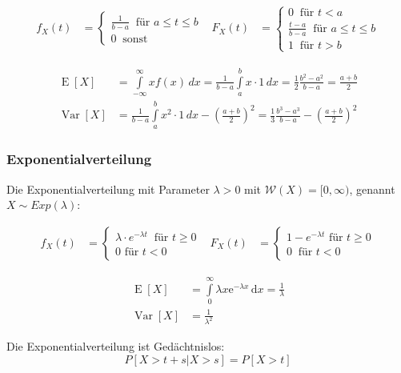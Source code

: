 \documentclass[25pt]{sciposter}
\newcommand{\W}{\mathcal{W}}
\newcommand{\Var}{\operatorname{Var}}
\newcommand{\E}{\operatorname{E}}
\begin{document}
\begin{multicols}{3}
\begin{align*}
	f_X(t) &= \begin{cases}
	\frac{1}{b-a} \ \text{ für } a \leq t \leq b\\
	0 \ \text{ sonst}
	\end{cases}
	& 
	F_X(t) &= \begin{cases}
	0 \ \text{ für } t<a \\
	\frac{t-a}{b-a} \ \text{ für } a \leq t \leq b\\
	1 \ \text{ für } t > b
	\end{cases}
\end{align*}


\begin{align*}
\E[X] &= {\displaystyle\int \limits _{-\infty }^{\infty }xf(x)\,dx={\frac {1}{b-a}}\int \limits _{a}^{b}x\cdot 1\,dx={\frac {1}{2}}{\frac {b^{2}-a^{2}}{b-a}}={\frac {a+b}{2}}} \\ \Var[X] &={\frac {1}{b-a}}\int \limits _{a}^{b}{x^{2}\cdot 1\,dx}-\left({\frac {a+b}{2}}\right)^{2}={\frac {1}{3}}{\frac {b^{3}-a^{3}}{b-a}}-\left({\frac {a+b}{2}}\right)^{2}
\end{align*}




\subsubsection*{Exponentialverteilung}
Die Exponentialverteilung mit Parameter $\lambda > 0$ mit $\W(X)=[0,\infty)$, genannt $X\sim Exp(\lambda)$:

\begin{align*}
f_X(t) &= \begin{cases}
\lambda \cdot e^{-\lambda t} \ \text{ für } t \geq 0\\
0 \text{ für } t < 0
\end{cases}
& 
F_X(t) &= \begin{cases}
1-e^{-\lambda t} \text{ für } t\geq 0\\
0 \ \text{ für } t < 0
\end{cases}
\end{align*}

\begin{align*}
	\E[X]&=\int \limits _{0}^{\infty }\lambda x{\mathrm  {e}}^{{-\lambda x}}\,{\mathrm  {d}}x={\frac  {1}{\lambda }}\\
	\Var[X] &= \frac{1}{\lambda^2}
\end{align*}

Die Exponentialverteilung ist Gedächtnislos: 
$$P[X > t+s| X > s] = P[X > t]$$


\end{multicols}
\end{document}
